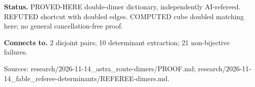 \textbf{Status.} PROVED-HERE double-dimer dictionary, independently AI-refereed. REFUTED shortcut with doubled edges. COMPUTED cube doubled matching here; no general cancellation-free proof.

\textbf{Connects to.} 2 disjoint pairs; 10 determinant extraction; 21 non-bijective failures.

{\footnotesize\raggedright Sources: research/\allowbreak{}2026-11-14\_astra\_route-dimers/\allowbreak{}PROOF.md;\allowbreak{} research/\allowbreak{}2026-11-14\_fable\_referee-determinants/\allowbreak{}REFEREE-dimers.md.\par}
